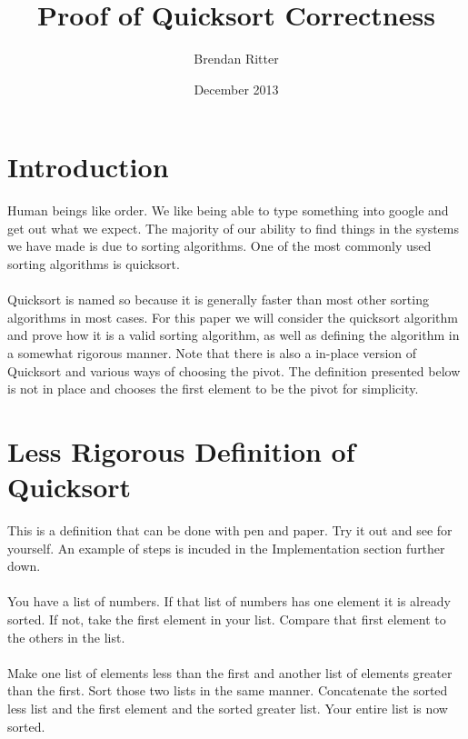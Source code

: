 \documentclass{article}
\title{Proof of Quicksort Correctness}
\author{Brendan Ritter}
\date{December 2013}
\begin{document}
\maketitle
\section{Introduction}
Human beings like order. We like being able to type something into google and get out what we expect. The majority of our ability to find things in the systems we have made is due to sorting algorithms. One of the most commonly used sorting algorithms is quicksort.
\\\\
Quicksort is named so because it is generally faster than most other sorting algorithms in most cases. For this paper we will consider the quicksort algorithm and prove how it is a valid sorting algorithm, as well as defining the algorithm in a somewhat rigorous manner. Note that there is also a in-place version of Quicksort and various ways of choosing the pivot. The definition presented below is not in place and chooses the first element to be the pivot for simplicity.


\section{Less Rigorous Definition of Quicksort}
This is a definition that can be done with pen and paper. Try it out and see for yourself. An example of steps is incuded in the Implementation section further down.
\\\\
You have a list of numbers. If that list of numbers has one element it is already sorted. If not, take the first element in your list. Compare that first element to the others in the list.
\\\\
Make one list of elements less than the first and another list of elements greater than the first. Sort those two lists in the same manner. Concatenate the sorted less list and the first element and the sorted greater list. Your entire list is now sorted. 
\end{document}

